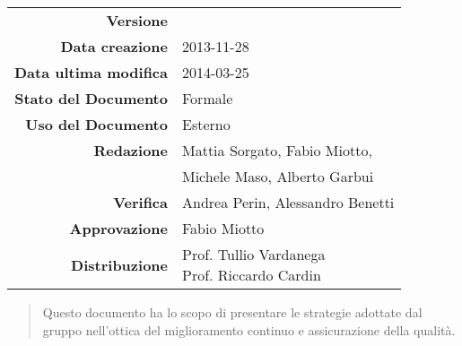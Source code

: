 

\newcommand{\Versione}{\versionePianoDiQualifica{}}	%
\newcommand{\Data}{2013-11-28}						%
\newcommand{\DataUltimaModifica}{2014-03-25}
\newcommand{\TipoDocumento}{Piano di Qualifica}		%




\begin{center}
\begin{tabular}{r|l}
\textbf{Versione} & \Versione{} \\
\textbf{Data creazione} & \Data{} \\
\textbf{Data ultima modifica} & \DataUltimaModifica{} \\
\textbf{Stato del Documento} & Formale \\		%
\textbf{Uso del Documento} & Esterno \\			%
\textbf{Redazione} & Mattia Sorgato, Fabio Miotto,\\			%
& Michele Maso, Alberto Garbui \\
\textbf{Verifica} & Andrea Perin, Alessandro Benetti \\%
\textbf{Approvazione} & Fabio Miotto\\				%
\textbf{Distribuzione} & \parbox[t]{4cm}{Prof. Tullio Vardanega \\ Prof. Riccardo Cardin \\ \Prop{} }
\end{tabular}
\end{center}

\vspace{0.05in}

\begin{abstract}
\begin{center}
Questo documento ha lo scopo di presentare le strategie adottate dal gruppo \NomeGruppo{} nell'ottica del miglioramento continuo e assicurazione della qualità.
\end{center}
\end{abstract}

